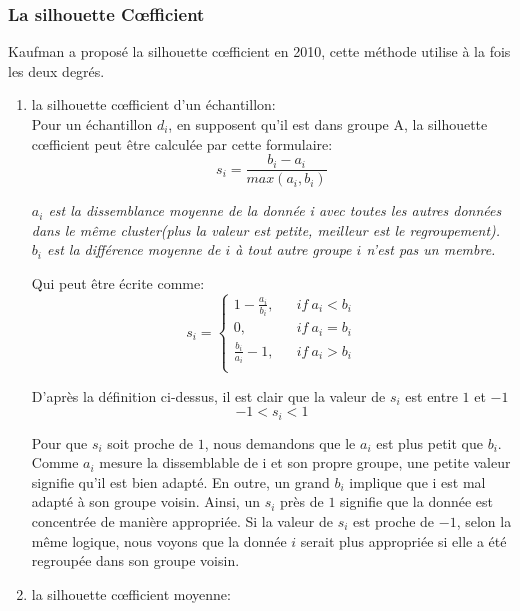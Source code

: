 \subsubsection{La silhouette C\oe fficient}

Kaufman a proposé la silhouette c\oe fficient en 2010, cette méthode utilise à la fois les deux degrés.

\begin{enumerate}
\item la silhouette c\oe fficient d'un échantillon:\\

 Pour un échantillon $d_{i}$, en supposent qu'il est dans groupe A, la silhouette c\oe fficient peut être calculée par cette formulaire:
$$s_{i}=\frac{b_{i}-a_{i}}{max(a_{i},b_{i})} $$

\emph{$a_{i}$ est la dissemblance moyenne de la donnée i avec toutes les autres données dans le même cluster(plus la valeur est petite, meilleur est le regroupement). $b_{i}$ est la différence moyenne de $i$ à tout autre groupe $i$ n'est pas un membre.}
\vspace{1ex}

Qui peut être écrite comme:
$$  s_{i}=\left\{
\begin{array}{rcl}
1-\frac{a_{i}}{b_{i}},       &      & if\  a_{i}<b_{i}\\
0,     &      & if\ a_{i}=b_{i}\\
\frac{b_{i}}{a_{i}}-1,     &      & if\ a_{i}>b_{i}\\
\end{array} \right. $$

D'après la définition ci-dessus, il est clair que la valeur de $s_{i}$ est entre $1$ et $-1$
$$-1<s_{i}<1$$

Pour que $s_{i}$ soit proche de $1$, nous demandons que le $a_{i}$ est plus petit que $b_{i}$. Comme $a_{i}$ mesure la dissemblable de i et son propre groupe, une petite valeur signifie qu'il est bien adapté. En outre, un grand $b_{i}$ implique que i est mal adapté à son groupe voisin. Ainsi, un $s_{i}$ près de $1$ signifie que la donnée est concentrée de manière appropriée. Si la valeur de $s_{i}$ est proche de $-1$, selon la même logique, nous voyons que la donnée $i$ serait plus appropriée si elle a été regroupée dans son groupe voisin.

\item la silhouette c\oe fficient moyenne:


\end{enumerate}
